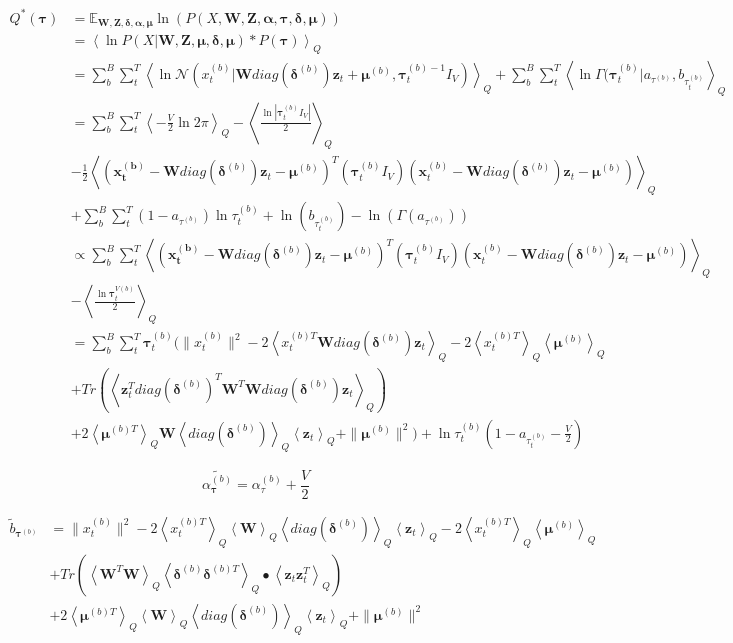 \documentclass[10pt]{article}
\newcommand{\Angle}[1]{\left \langle #1 \right \rangle}
\newcommand{\Eq}[1]{\Angle{#1}_Q}
\newcommand{\N}[2][]{\mathcal{N} \left( #1,#2 \right)}
\begin{document}
    \begin{align}
        Q^*(\bm{\tau}) &= \mathbb{E}_{\bm{W},\bm{Z},\bm{\delta}, \bm{\alpha}, \bm{\mu}}\ln(P(X,\bm{W},\bm{Z}, \bm{\alpha}, \bm{\tau}, \bm{\delta}, \bm{\mu})) \nonumber \\
        &= \Eq{\ln{P(X|\bm{W},\bm{Z}, \bm{\mu}, \bm{\delta}, \bm{\mu})*P(\bm{\tau})}} \nonumber \\
        &= \sum_b^B\sum_t^T\Eq{\ln{\N[x_t^{(b)}|\bm{W}diag(\bm{\delta}^{(b)})\bm{z}_t + \bm{\mu}^{(b)}]{\bm{\tau}_t^{(b)-1}I_V}}} + \sum_b^B\sum_t^T\Eq{\ln{\Gamma(\bm{\tau}_{t}^{(b)}|a_{\tau^{(b)}},b_{\tau_{t}^{(b)}}}} \nonumber \\
        & = \sum_b^B\sum_t^T\Eq{-\frac{V}{2}\ln{2\pi}} - \Eq{ \frac{\ln{|\bm{\tau}_t^{(b)}I_V|}}{2}} \nonumber \\
        & -\frac{1}{2}\Eq{(\bm{x_t^{(b)}} - \bm{W}diag(\bm{\delta}^{(b)})\bm{z}_t - \bm{\mu}^{(b)})^T(\bm{\tau}_t^{(b)}I_V)(\bm{x}_t^{(b)} -  \bm{W}diag(\bm{\delta}^{(b)})\bm{z}_t - \bm{\mu}^{(b)})} \nonumber \\
        & + \sum_b^B\sum_t^T (1-a_{\tau^{(b)}})\ln{\tau_t^{(b)}}+\ln(b_{\tau_{t}^{(b)}}) - \ln(\Gamma(a_{\tau^{(b)}})) \nonumber \\
        & \propto \sum_b^B \sum_t^T\Eq{(\bm{x_t^{(b)}} - \bm{W}diag(\bm{\delta}^{(b)})\bm{z}_t - \bm{\mu}^{(b)})^T(\bm{\tau}_t^{(b)}I_V)(\bm{x}_t^{(b)} -  \bm{W}diag(\bm{\delta}^{(b)})\bm{z}_t - \bm{\mu}^{(b)})}\nonumber \\
        & - \Eq{ \frac{\ln{\bm{\tau}_t^{V(b)}}}{2}} \nonumber \\
        &=\sum_b^B \sum_t^T\bm{\tau}_t^{(b)}(\|x_t^{(b)}\|^2 - 2\Eq{x_t^{(b)T}\bm{W}diag(\bm{\delta}^{(b)})\bm{z}_t} - 2\Eq{x_t^{(b)T}}\Eq{\bm{\mu}^{(b)}} \nonumber \\
        & + Tr(\Eq{\bm{z}_t^Tdiag(\bm{\delta}^{(b)})^T\bm{W}^T\bm{W}diag(\bm{\delta}^{(b)})\bm{z}_t})\nonumber \\
        &+ 2 \Eq{\bm{\mu}^{(b)T}}\bm{W}\Eq{diag(\bm{\delta}^{(b)})}\Eq{\bm{z}_t} + \|\bm{\mu}^{(b)}\|^2) + \ln{\tau_t^{(b)}}(1-a_{\tau_t^{(b)}} - \frac{V}{2})
    \end{align}

    \begin{equation}
        \tilde{\alpha_{\bm{\tau}}^{(b)}} = \alpha_{\tau}^{(b)} + \frac{V}{2}
    \end{equation}

    \begin{align}
        \tilde{b}_{\bm{\tau}^{(b)}} &= \|x_t^{(b)}\|^2 - 2\Eq{x_t^{(b)T}}\Eq{\bm{W}}\Eq{diag(\bm{\delta}^{(b)})}\Eq{\bm{z}_t} - 2\Eq{x_t^{(b)T}}\Eq{\bm{\mu}^{(b)}} \nonumber \\
        & + Tr(\Eq{\bm{W}^T\bm{W}}\Eq{\bm{\delta}^{(b)}\bm{\delta}^{(b)T}}\bullet\Eq{\bm{z}_t\bm{z}_t^T})\nonumber \\
        &+ 2 \Eq{\bm{\mu}^{(b)T}}\Eq{\bm{W}}\Eq{diag(\bm{\delta}^{(b)})}\Eq{\bm{z}_t} + \|\bm{\mu}^{(b)}\|^2
    \end{align}
\end{document}
